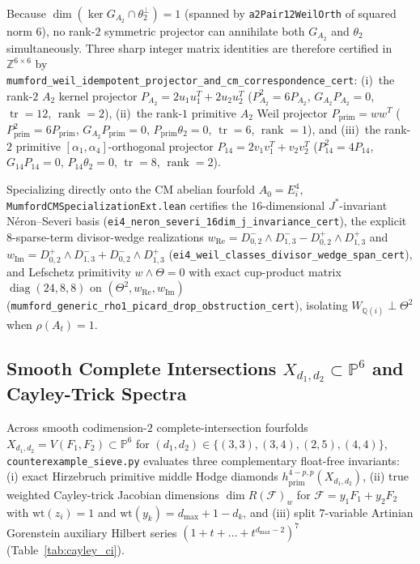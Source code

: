 \documentclass[11pt,a4paper]{article}
\begin{document}
Because $\dim(\ker G_{A_2} \cap \theta_2^\perp) = 1$ (spanned by \texttt{a2Pair12WeilOrth} of squared norm $6$), no rank-$2$ symmetric projector can annihilate both $G_{A_2}$ and $\theta_2$ simultaneously. Three sharp integer matrix identities are therefore certified in $\mathbb{Z}^{6 \times 6}$ by\\
{\small\texttt{mumford\_weil\_idempotent\_projector\_and\_cm\_correspondence\_cert}}:
(i)~the rank-$2$ $A_2$ kernel projector $P_{A_2} = 2 u_1 u_1^T + 2 u_2 u_2^T$ ($P_{A_2}^2 = 6 P_{A_2}$, $G_{A_2} P_{A_2} = 0$, $\operatorname{tr} = 12$, $\operatorname{rank} = 2$), (ii)~the rank-$1$ primitive $A_2$ Weil projector $P_{\mathrm{prim}} = w w^T$ ($P_{\mathrm{prim}}^2 = 6 P_{\mathrm{prim}}$, $G_{A_2} P_{\mathrm{prim}} = 0$, $P_{\mathrm{prim}} \theta_2 = 0$, $\operatorname{tr} = 6$, $\operatorname{rank} = 1$), and (iii)~the rank-$2$ primitive $[\alpha_1, \alpha_4]$-orthogonal projector $P_{14} = 2 v_1 v_1^T + v_2 v_2^T$ ($P_{14}^2 = 4 P_{14}$, $G_{14} P_{14} = 0$, $P_{14} \theta_2 = 0$, $\operatorname{tr} = 8$, $\operatorname{rank} = 2$).

Specializing directly onto the CM abelian fourfold $A_0 = E_i^4$, \texttt{Mumford\allowbreak{}CM\allowbreak{}Specialization\allowbreak{}Ext.lean} certifies the $16$-dimensional $J^*$-invariant N\'eron--Severi basis (\texttt{ei4\_\allowbreak{}neron\_\allowbreak{}severi\_\allowbreak{}16dim\_\allowbreak{}j\_\allowbreak{}invariance\_\allowbreak{}cert}), the explicit $8$-sparse-term divisor-wedge realizations $w_{\mathrm{Re}} = D^-_{0,2} \wedge D^-_{1,3} - D^+_{0,2} \wedge D^+_{1,3}$ and $w_{\mathrm{Im}} = D^+_{0,2} \wedge D^-_{1,3} + D^-_{0,2} \wedge D^+_{1,3}$ (\texttt{ei4\_\allowbreak{}weil\_\allowbreak{}classes\_\allowbreak{}divisor\_\allowbreak{}wedge\_\allowbreak{}span\_\allowbreak{}cert}), and Lefschetz primitivity $w \wedge \Theta = 0$ with exact cup-product matrix $\operatorname{diag}(24, 8, 8)$ on $(\Theta^2, w_{\mathrm{Re}}, w_{\mathrm{Im}})$ (\texttt{mumford\_\allowbreak{}generic\_\allowbreak{}rho1\_\allowbreak{}picard\_\allowbreak{}drop\_\allowbreak{}obstruction\_\allowbreak{}cert}), isolating $W_{\mathbb{Q}(i)} \perp \Theta^2$ when $\rho(A_t) = 1$.

\subsection{Smooth Complete Intersections $X_{d_1,d_2} \subset \mathbb{P}^6$ and Cayley-Trick Spectra}

Across smooth codimension-$2$ complete-intersection fourfolds $X_{d_1, d_2} = V(F_1, F_2) \subset \mathbb{P}^6$ for $(d_1, d_2) \in \{(3,3), (3,4), (2,5), (4,4)\}$, \texttt{counterexample\_sieve.py} evaluates three complementary float-free invariants: (i) exact Hirzebruch primitive middle Hodge diamonds $h^{4-p, p}_{\mathrm{prim}}(X_{d_1, d_2})$, (ii) true weighted Cayley-trick Jacobian dimensions $\dim R(\mathcal{F})_w$ for $\mathcal{F} = y_1 F_1 + y_2 F_2$ with $\mathrm{wt}(z_i) = 1$ and $\mathrm{wt}(y_k) = d_{\max} + 1 - d_k$, and (iii) split $7$-variable Artinian Gorenstein auxiliary Hilbert series $(1 + t + \dots + t^{d_{\max}-2})^7$ (Table~\ref{tab:cayley_ci}).
\end{document}
